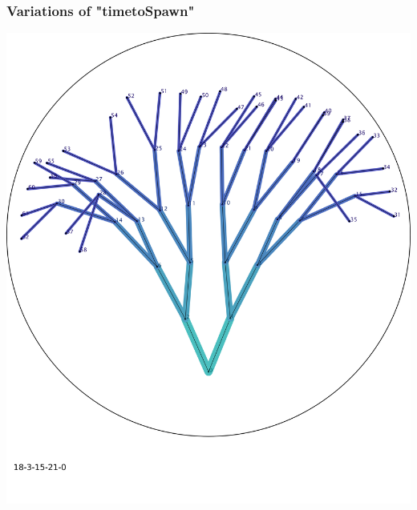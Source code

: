 \documentclass{scrartcl}
\newcommand{\imgSize}{0.46}
\begin{document}
\newpage
\subsubsection{Variations of "timetoSpawn"}

\begin{minipage}[t]{\imgSize\textwidth}
\includegraphics[width=\textwidth]{img_18-3-15-21-0}
\label{timetoSpawn3000}
\end{minipage}
\hspace{0.5cm}
\end{document}
